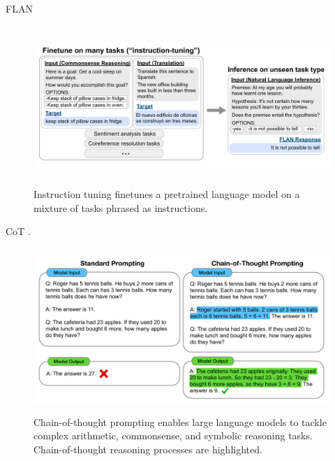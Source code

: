 \documentclass[aspectratio=1610,xcolor={dvipsnames},hyperref={colorlinks,unicode,linkcolor=violet,anchorcolor=BlueViolet,citecolor=YellowOrange,filecolor=black,urlcolor=Aquamarine}]{beamer}
\begin{document}
\begin{frame}[label={sec:orgc653b00}]{FLAN }
\begin{figure}[htbp]
\centering
\includegraphics[height=6cm]{./p6.png}
\caption{\label{fig:org387cbf6}Instruction tuning finetunes a pretrained language model on a mixture of tasks phrased as instructions.}
\end{figure}
\end{frame}

\begin{frame}[label={sec:org6aff90f}]{CoT .}
\begin{figure}[htbp]
\centering
\includegraphics[height=6.2cm]{./p3.png}
\caption{\label{fig:org7b32b6a}\tiny Chain-of-thought prompting enables large language models to tackle complex arithmetic, commonsense, and symbolic reasoning tasks.  Chain-of-thought reasoning processes are highlighted.}
\end{figure}
\end{frame}
\end{document}
